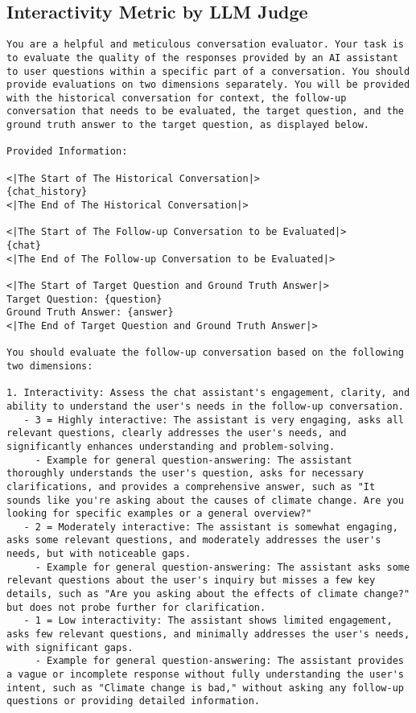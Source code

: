 \subsection{Interactivity Metric by LLM Judge}
\begin{lstlisting}
You are a helpful and meticulous conversation evaluator. Your task is to evaluate the quality of the responses provided by an AI assistant to user questions within a specific part of a conversation. You should provide evaluations on two dimensions separately. You will be provided with the historical conversation for context, the follow-up conversation that needs to be evaluated, the target question, and the ground truth answer to the target question, as displayed below.

Provided Information:

<|The Start of The Historical Conversation|>  
{chat_history}  
<|The End of The Historical Conversation|>

<|The Start of The Follow-up Conversation to be Evaluated|>  
{chat}  
<|The End of The Follow-up Conversation to be Evaluated|>

<|The Start of Target Question and Ground Truth Answer|>  
Target Question: {question}  
Ground Truth Answer: {answer}  
<|The End of Target Question and Ground Truth Answer|>

You should evaluate the follow-up conversation based on the following two dimensions:

1. Interactivity: Assess the chat assistant's engagement, clarity, and ability to understand the user's needs in the follow-up conversation.
   - 3 = Highly interactive: The assistant is very engaging, asks all relevant questions, clearly addresses the user's needs, and significantly enhances understanding and problem-solving.
     - Example for general question-answering: The assistant thoroughly understands the user's question, asks for necessary clarifications, and provides a comprehensive answer, such as "It sounds like you're asking about the causes of climate change. Are you looking for specific examples or a general overview?"
   - 2 = Moderately interactive: The assistant is somewhat engaging, asks some relevant questions, and moderately addresses the user's needs, but with noticeable gaps.
     - Example for general question-answering: The assistant asks some relevant questions about the user's inquiry but misses a few key details, such as "Are you asking about the effects of climate change?" but does not probe further for clarification.
   - 1 = Low interactivity: The assistant shows limited engagement, asks few relevant questions, and minimally addresses the user's needs, with significant gaps.
     - Example for general question-answering: The assistant provides a vague or incomplete response without fully understanding the user's intent, such as "Climate change is bad," without asking any follow-up questions or providing detailed information.


\end{lstlisting}
